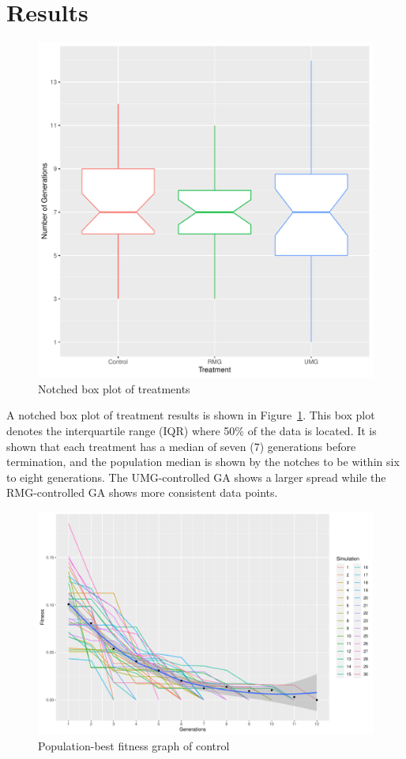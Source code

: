 \documentclass{strrespaper-journ}
\begin{document}
	\section{Results}
		\begin{figure}[htbp]
			\centering
			\includegraphics[width=\linewidth]{../figures/boxplot}
			\caption{Notched box plot of treatments}
			\label{fig:boxplot}
		\end{figure}

		A notched box plot of treatment results is shown in Figure~\ref{fig:boxplot}.
		This box plot denotes the interquartile range (IQR) where 50\% of the data is located.
		It is shown that each treatment has a median of seven (7) generations before termination, and the population median is shown by the notches to be within six to eight generations.
		The UMG-controlled GA shows a larger spread while the RMG-controlled GA shows more consistent data points.

		\begin{figure}[htbp]
			\centering
			\includegraphics[width=\linewidth]{../figures/ctrl_ftrack}
			\caption{Population-best fitness graph of control}
			\label{fig:fitgraph_ctrl}
		\end{figure}
\end{document}
